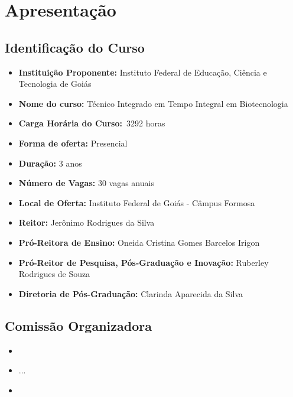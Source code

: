 \documentclass[11pt,fleqn]{book} %
\newcommand{\VER}[1]{\begingroup\color{red}#1\endgroup}
\begin{document}
\renewcommand\contentsname{Sumário}
\tableofcontents

\chapter{Apresentação}
\vspace{6em}
\begin{flushright}
	\textit{ }
\end{flushright}
\vspace{12em}
\indent


\section{Identificação do Curso}
\begin{itemize}
	\item \textbf{Instituição Proponente:} Instituto Federal de Educação, Ciência e Tecnologia de Goiás
	\item \textbf{Nome do curso:} Técnico Integrado em Tempo Integral em Biotecnologia
	\item \textbf{Carga Horária do Curso:}~\VER{3292} horas
	\item \textbf{Forma de oferta:} Presencial
	\item \textbf{Duração:} 3 anos
	\item \textbf{Número de Vagas:} 30 vagas anuais
	\item \textbf{Local de Oferta:} Instituto Federal de Goiás - Câmpus Formosa
	\item \textbf{Reitor:} Jerônimo Rodrigues da Silva
	\item \textbf{Pró-Reitora de Ensino:} Oneida Cristina Gomes Barcelos Irigon
	\item \textbf{Pró-Reitor de Pesquisa, Pós-Graduação e Inovação:} Ruberley Rodrigues de Souza
	\item \textbf{Diretoria de Pós-Graduação:} Clarinda Aparecida da Silva
\end{itemize}

\newpage  
\section{Comissão Organizadora}
	\begin{itemize}[label=\bfseries]
		\item {}
		\item ...
		\item {}
	\end{itemize}
\end{document}
